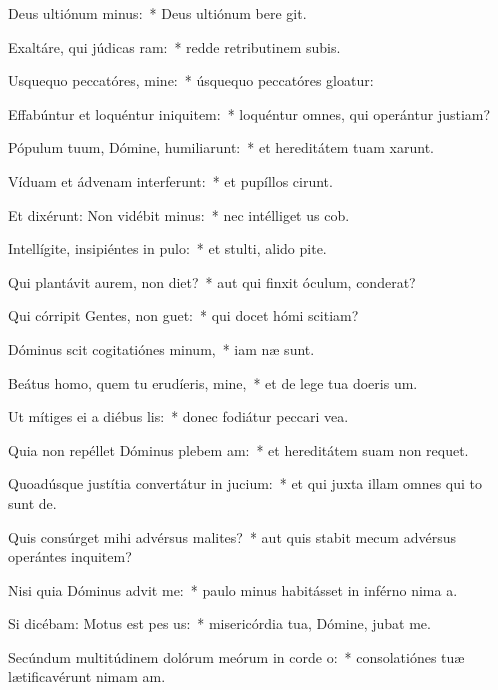 \item Deus ultiónum minus:~* Deus ultiónum bere git.
\item Exaltáre, qui júdicas ram:~* redde retributinem subis.
\item Usquequo peccatóres, mine:~* úsquequo peccatóres gloatur:
\item Effabúntur et loquéntur iniquitem:~* loquéntur omnes, qui operántur justiam?
\item Pópulum tuum, Dómine, humiliarunt:~* et hereditátem tuam xarunt.
\item Víduam et ádvenam interferunt:~* et pupíllos cirunt.
\item Et dixérunt: Non vidébit minus:~* nec intélliget us cob.
\item Intellígite, insipiéntes in pulo:~* et stulti, alido pite.
\item Qui plantávit aurem, non diet?~* aut qui finxit óculum,  conderat?
\item Qui córripit Gentes, non guet:~* qui docet hómi scitiam?
\item Dóminus scit cogitatiónes minum,~* iam næ sunt.
\item Beátus homo, quem tu erudíeris, mine,~* et de lege tua doeris um.
\item Ut mítiges ei a diébus lis:~* donec fodiátur peccari vea.
\item Quia non repéllet Dóminus plebem am:~* et hereditátem suam non requet.
\item Quoadúsque justítia convertátur in jucium:~* et qui juxta illam omnes qui to sunt de.
\item Quis consúrget mihi advérsus malites?~* aut quis stabit mecum advérsus operántes inquitem?
\item Nisi quia Dóminus advit me:~* paulo minus habitásset in inférno nima a.
\item Si dicébam: Motus est pes us:~* misericórdia tua, Dómine, jubat me.
\item Secúndum multitúdinem dolórum meórum in corde o:~* consolatiónes tuæ lætificavérunt nimam am.
